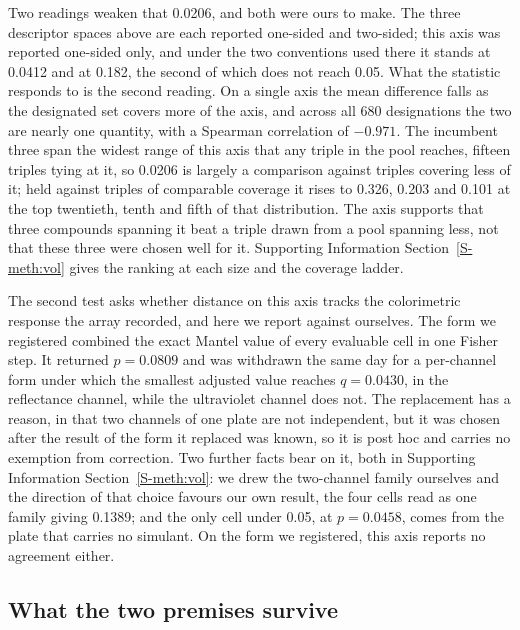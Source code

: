 \documentclass[journal=ancham,manuscript=article,margin=1in]{achemso}
\begin{document}
Two readings weaken that 0.0206, and both were ours to make. The three
descriptor spaces above are each reported one-sided and two-sided; this axis was
reported one-sided only, and under the two conventions used there it stands at
0.0412 and at 0.182, the second of which does not reach 0.05. What the statistic
responds to is the second reading. On a single axis the mean difference falls as
the designated set covers more of the axis, and across all 680 designations the
two are nearly one quantity, with a Spearman correlation of $-0.971$. The
incumbent three span the widest range of this axis that any triple in the pool
reaches, fifteen triples tying at it, so
0.0206 is largely a comparison against triples covering less of it; held against
triples of comparable coverage it rises to 0.326, 0.203 and 0.101 at the top
twentieth, tenth and fifth of that distribution. The axis supports that three compounds spanning it
beat a triple drawn from a pool spanning less, not that these three were chosen
well for it. Supporting Information Section~\ref{S-meth:vol} gives the ranking
at each size and the coverage ladder.

The second test asks whether distance on this axis tracks the colorimetric
response the array recorded, and here we report against ourselves. The form we
registered combined the exact Mantel value of every evaluable cell in one Fisher
step. It returned $p = 0.0809$ and was withdrawn the same day for a per-channel
form under which the smallest adjusted value reaches $q = 0.0430$, in the
reflectance channel, while the ultraviolet channel does not. The replacement has
a reason, in that two channels of one plate are not independent, but it was
chosen after the result of the form it replaced was known, so it is post hoc and
carries no exemption from correction. Two further facts bear on it, both in
Supporting Information Section~\ref{S-meth:vol}: we drew the two-channel family
ourselves and the direction of that choice favours our own result, the four
cells read as one family giving 0.1389; and the only cell under 0.05, at
$p = 0.0458$, comes from the plate that carries no simulant. On the form we
registered, this axis reports no agreement either.

\subsection{What the two premises survive}
\label{res:measured}
\label{res:toxsummary}
\end{document}
